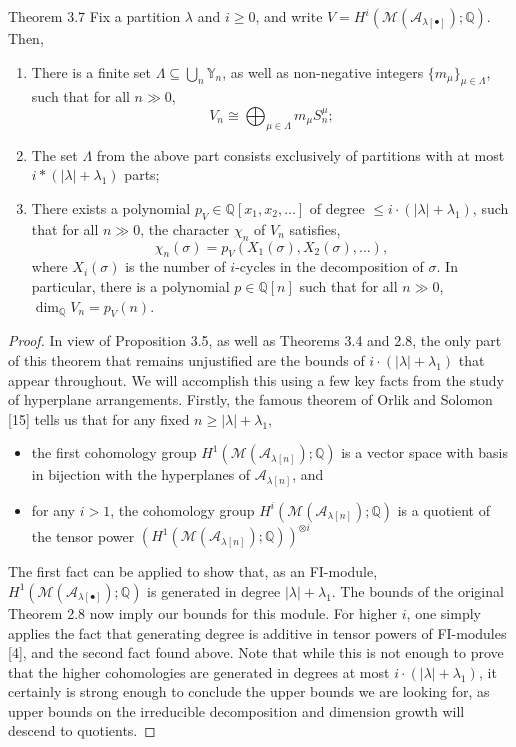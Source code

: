 \begin{sourceblock}{Theorem 3.7}
Fix a partition $\lambda$ and $i\geq0$, and write $V=H^i(\mathcal{M}(\mathcal{A}_{\lambda[\bullet]});\mathbb{Q})$. Then,
\begin{enumerate}
\item There is a finite set $\Lambda\subseteq\bigcup_n\mathbb{Y}_n$, as well as non-negative integers $\{m_\mu\}_{\mu\in\Lambda}$, such that for all $n\gg0$,
\[
 V_n\cong\bigoplus_{\mu\in\Lambda}m_\mu S_n^\mu;
\]
\item The set $\Lambda$ from the above part consists exclusively of partitions with at most $i*(|\lambda|+\lambda_1)$ parts;
\item There exists a polynomial $p_V\in\mathbb{Q}[x_1,x_2,\ldots]$ of degree $\leq i\cdot(|\lambda|+\lambda_1)$, such that for all $n\gg0$, the character $\chi_n$ of $V_n$ satisfies,
\[
 \chi_n(\sigma)=p_V(X_1(\sigma),X_2(\sigma),\ldots),
\]
where $X_i(\sigma)$ is the number of $i$-cycles in the decomposition of $\sigma$. In particular, there is a polynomial $p\in\mathbb{Q}[n]$ such that for all $n\gg0$, $\dim_{\mathbb{Q}}V_n=p_V(n)$.
\end{enumerate}
\end{sourceblock}

\begin{proof}
In view of Proposition 3.5, as well as Theorems 3.4 and 2.8, the only part of this theorem that remains unjustified are the bounds of $i\cdot(|\lambda|+\lambda_1)$ that appear throughout. We will accomplish this using a few key facts from the study of hyperplane arrangements. Firstly, the famous theorem of Orlik and Solomon [15] tells us that for any fixed $n\geq|\lambda|+\lambda_1$,
\begin{itemize}
\item the first cohomology group $H^1(\mathcal{M}(\mathcal{A}_{\lambda[n]});\mathbb{Q})$ is a vector space with basis in bijection with the hyperplanes of $\mathcal{A}_{\lambda[n]}$, and
\item for any $i>1$, the cohomology group $H^i(\mathcal{M}(\mathcal{A}_{\lambda[n]});\mathbb{Q})$ is a quotient of the tensor power $(H^1(\mathcal{M}(\mathcal{A}_{\lambda[n]});\mathbb{Q}))^{\otimes i}$
\end{itemize}
The first fact can be applied to show that, as an FI-module, $H^1(\mathcal{M}(\mathcal{A}_{\lambda[\bullet]});\mathbb{Q})$ is generated in degree $|\lambda|+\lambda_1$. The bounds of the original Theorem 2.8 now imply our bounds for this module. For higher $i$, one simply applies the fact that generating degree is additive in tensor powers of FI-modules [4], and the second fact found above. Note that while this is not enough to prove that the higher cohomologies are generated in degrees at most $i\cdot(|\lambda|+\lambda_1)$, it certainly is strong enough to conclude the upper bounds we are looking for, as upper bounds on the irreducible decomposition and dimension growth will descend to quotients.
\end{proof}

